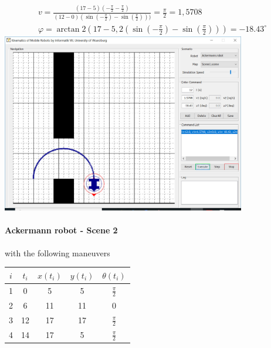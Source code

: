 \documentclass{article}
\begin{document}
	\begin{gather}
	v = \frac{(17-5)(-\frac{\pi}{2}-\frac{\pi}{2})}{(12-0)(\sin(-\frac{\pi}{2}) - \sin(\frac{\pi}{2})))} = \frac{\pi}{2} = 1,5708\\
	\varphi = \arctan2(17 - 5, 2 (\sin(-\frac{\pi}{2}) - \sin(\frac{\pi}{2}))) = -18.43^\circ
	\end{gather}
	\includegraphics[width=0.8\textwidth]{figures/ackermann-scene-1.JPG}
	
	\paragraph{Ackermann robot - Scene 2} with the following maneuvers
	
	\begin{tabular}{|c|c|c|c|c|}
		\hline 
		$i$ & $t_i$ & $x(t_i)$ & $y(t_i)$ & $\theta(t_i)$ \\ 
		\hline 
		1 & 0 & 5 & 5 & $\frac{\pi}{2}$ \\ 
		\hline 
		2 & 6 & 11 & 11 & 0 \\ 
		\hline 
		3 & 12 & 17 & 17 & $\frac{\pi}{2}$ \\ 
		\hline 
		4 & 14 & 17 & 5 & $\frac{\pi}{2}$ \\ 
		\hline 
	\end{tabular} 
	\\
\end{document}
